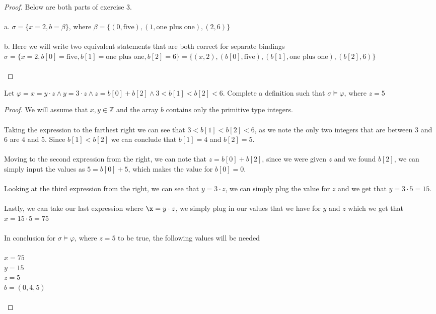\documentclass[12pt]{article}
\newenvironment{exercise}[2][Exercise]{\begin{trivlist}
\item[\hskip \labelsep {\bfseries #1}\hskip \labelsep {\bfseries #2.}]}{\end{trivlist}}
\begin{document}
\begin{proof}
Below are both parts of exercise 3. \\ \\ 
a. $\sigma = \{x = 2, b = \beta\}$, where $\beta = \{(0, \text{five}), (1, \text{one plus one}), (2, 6)\}$ \\ \\ 
b. Here we will write two equivalent statements that are both correct for separate bindings \\
$\sigma = \{x = 2, b[0] = \text{five}, b[1] = \text{one plus one}, b[2] = 6\} = \{(x,2), (b[0],\text{five}),(b[1],\text{one plus one}),(b[2],6)\}$ \\ \\
\end{proof}
 
\begin{exercise}{4}
Let $\varphi = x = y \cdot z \land y = 3 \cdot z \land z = b[0] + b[2] \land 3 < b[1] < b[2] < 6$. Complete a definition such that $\sigma \models \varphi$, where $z = 5$
\end{exercise}

\begin{proof}
We will assume that $x, y \in \mathbb{Z}$ and the array $b$ contains only the primitive type integers. \\ \\ 
Taking the expression to the farthest right we can see that $3 < b[1] < b[2] < 6$, as we note the only two integers that are between $3$ and $6$ are $4$ and $5$. Since $b[1] < b[2]$ we can conclude that $b[1] = 4$ and $b[2] = 5$. \\ \\ 
Moving to the second expression from the right, we can note that $z = b[0] + b[2]$, since we were given $z$ and we found $b[2]$, we can simply input the values as $5 = b[0] + 5$, which makes the value for $b[0] = 0$. \\ \\ 
Looking at the third expression from the right, we can see that $y = 3 \cdot z$, we can simply plug the value for $z$ and we get that $y = 3 \cdot 5 = 15$. \\ \\ Lastly, we can take our last expression where $\x = y \cdot z$, we simply plug in our values that we have for $y$ and $z$ which we get that $x = 15 \cdot 5 = 75$ \\ \\
In conclusion for $\sigma \models \varphi$, where $z = 5$ to be true, the following values will be needed \\ \\ 
$x = 75$ \\
$y = 15$ \\ 
$z = 5$ \\
$b = (0,4,5)$ \\ \\
\end{proof}
\end{document}
